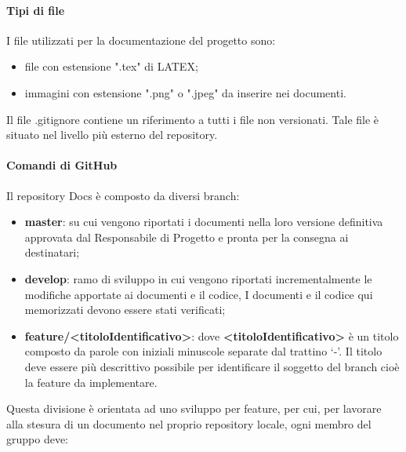             \paragraph{Tipi di file}
                I file utilizzati per la documentazione del progetto sono:
                \begin{itemize}
                    \item file con estensione ".tex" di LATEX;
                    \item immagini con estensione ".png" o ".jpeg" da inserire nei documenti.
                \end{itemize}
                Il file .gitignore contiene un riferimento a tutti i file non versionati. Tale file è situato nel livello più esterno del repository.
            \paragraph{Comandi di GitHub}
                Il repository Docs è composto da diversi branch:
                \begin{itemize}
                    \item\textbf{master}: su cui vengono riportati i documenti nella loro versione definitiva approvata dal Responsabile di Progetto e pronta per la consegna ai destinatari;
                    \item\textbf{develop}: ramo di sviluppo in cui vengono riportati incrementalmente le modifiche apportate ai documenti e il codice, I documenti e il codice qui memorizzati devono essere stati verificati;
                    \item\textbf{feature/<titoloIdentificativo>}: dove \textbf{<titoloIdentificativo>} è un titolo composto da parole con iniziali minuscole separate dal trattino ‘-’. Il titolo deve essere più descrittivo possibile per identificare il soggetto del branch cioè la feature da implementare.
                \end{itemize}
                Questa divisione è orientata ad uno sviluppo per feature, per cui, per lavorare alla stesura di un documento nel proprio repository locale, ogni membro del gruppo deve:
